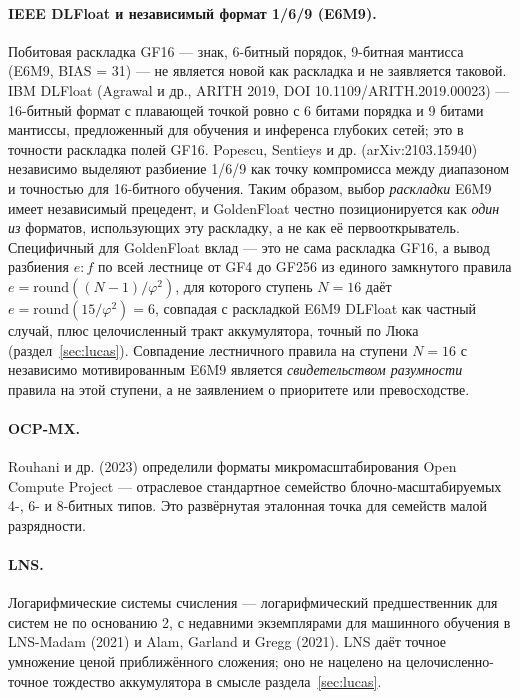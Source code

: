 \documentclass[11pt,a4paper]{article}
\theoremstyle{plain}
\begin{document}
\paragraph{IEEE DLFloat и независимый формат 1/6/9 (E6M9).}
\label{par:dlfloat}
Побитовая раскладка GF16 --- знак, 6-битный порядок, 9-битная мантисса
(E6M9, BIAS = 31) --- не является новой как раскладка и не заявляется таковой.
IBM DLFloat (Agrawal и др., ARITH 2019, DOI 10.1109/ARITH.2019.00023) ---
16-битный формат с плавающей точкой ровно с 6 битами порядка и 9 битами
мантиссы, предложенный для обучения и инференса глубоких сетей; это в точности
раскладка полей GF16. Popescu, Sentieys и др. (arXiv:2103.15940) независимо
выделяют разбиение 1/6/9 как точку компромисса между диапазоном и точностью для
16-битного обучения. Таким образом, выбор \emph{раскладки} E6M9 имеет
независимый прецедент, и GoldenFloat честно позиционируется как \emph{один из}
форматов, использующих эту раскладку, а не как её первооткрыватель. Специфичный
для GoldenFloat вклад --- это не сама раскладка GF16, а вывод разбиения
\(e:f\) по всей лестнице от GF4 до GF256 из единого замкнутого правила
\(e = \mathrm{round}((N-1)/\varphi^{2})\), для которого ступень \(N = 16\) даёт
\(e = \mathrm{round}(15/\varphi^{2}) = 6\), совпадая с раскладкой E6M9 DLFloat
как частный случай, плюс целочисленный тракт аккумулятора, точный по Люка
(раздел~\ref{sec:lucas}). Совпадение лестничного правила на ступени \(N = 16\) с
независимо мотивированным E6M9 является \emph{свидетельством разумности} правила
на этой ступени, а не заявлением о приоритете или превосходстве.

\paragraph{OCP-MX.}
Rouhani и др. (2023) определили форматы микромасштабирования Open Compute
Project --- отраслевое стандартное семейство блочно-масштабируемых 4-, 6- и
8-битных типов. Это развёрнутая эталонная точка для семейств малой разрядности.

\paragraph{LNS.}
Логарифмические системы счисления --- логарифмический предшественник для систем
не по основанию 2, с недавними экземплярами для машинного обучения в LNS-Madam
(2021) и Alam, Garland и Gregg (2021). LNS даёт точное умножение ценой
приближённого сложения; оно не нацелено на целочисленно-точное тождество
аккумулятора в смысле раздела~\ref{sec:lucas}.
\end{document}
